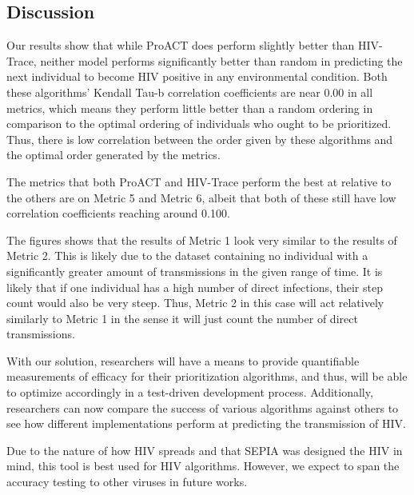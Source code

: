 \documentclass[twocolumn]{bmcart}%
\begin{document}
\begin{multicols}
\section*{Discussion}
Our results show that while ProACT does perform slightly better than HIV-Trace, neither model performs significantly better than random in predicting the next individual to become HIV positive in any environmental condition. Both these algorithms' Kendall Tau-b correlation coefficients are near 0.00 in all metrics, which means they perform little better than a random ordering in comparison to the optimal ordering of individuals who ought to be prioritized. Thus, there is low correlation between the order given by these algorithms and the optimal order generated by the metrics.

The metrics that both ProACT and HIV-Trace perform the best at relative to the others are on Metric 5 and Metric 6, albeit that both of these still have low correlation coefficients reaching around 0.100. 

The figures shows that the results of Metric 1 look very similar to the results of Metric 2. This is likely due to the dataset containing no individual with a significantly greater amount of transmissions in the given range of time. It is likely that if one individual has a high number of direct infections, their step count would also be very steep. Thus, Metric 2 in this case will act relatively similarly to Metric 1 in the sense it will just count the number of direct transmissions.

With our solution, researchers will have a means to provide quantifiable measurements of efficacy for their prioritization algorithms, and thus, will be able to optimize accordingly in a test-driven development process. Additionally, researchers can now compare the success of various algorithms against others to see how different implementations perform at predicting the transmission of HIV.

Due to the nature of how HIV spreads and that SEPIA was designed the HIV in mind, this tool is best used for HIV algorithms. However, we expect to span the accuracy testing to other viruses in future works.

\begin{backmatter}


\end{backmatter}
\end{multicols}
\end{document}
